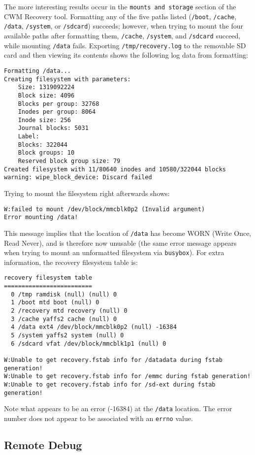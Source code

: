 \documentclass{article}
\begin{document}
The more interesting results occur in the \texttt{mounts and storage} section of the CWM Recovery tool. Formatting any of the five paths listed (\texttt{/boot}, \texttt{/cache}, \texttt{/data}, \texttt{/system}, or \texttt{/sdcard}) succeeds; however, when trying to mount the four available paths after formatting them, \texttt{/cache}, \texttt{/system}, and \texttt{/sdcard} succeed, while mounting \texttt{/data} fails. Exporting \texttt{/tmp/recovery.log} to the removable SD card and then viewing its contents shows the following log data from formatting:
\begin{lstlisting}
Formatting /data...
Creating filesystem with parameters:
    Size: 1319092224
    Block size: 4096
    Blocks per group: 32768
    Inodes per group: 8064
    Inode size: 256
    Journal blocks: 5031
    Label: 
    Blocks: 322044
    Block groups: 10
    Reserved block group size: 79
Created filesystem with 11/80640 inodes and 10580/322044 blocks
warning: wipe_block_device: Discard failed
\end{lstlisting}
Trying to mount the filesystem right afterwards shows:
\begin{lstlisting}
W:failed to mount /dev/block/mmcblk0p2 (Invalid argument)
Error mounting /data!
\end{lstlisting}
This message implies that the location of \texttt{/data} has become WORN (Write Once, Read Never), and is therefore now unusable (the same error message appears when trying to mount an unformatted filesystem via \texttt{busybox}). For extra information, the recovery filesystem table is:
\begin{lstlisting}
recovery filesystem table
=========================
  0 /tmp ramdisk (null) (null) 0
  1 /boot mtd boot (null) 0
  2 /recovery mtd recovery (null) 0
  3 /cache yaffs2 cache (null) 0
  4 /data ext4 /dev/block/mmcblk0p2 (null) -16384
  5 /system yaffs2 system (null) 0
  6 /sdcard vfat /dev/block/mmcblk1p1 (null) 0

W:Unable to get recovery.fstab info for /datadata during fstab generation!
W:Unable to get recovery.fstab info for /emmc during fstab generation!
W:Unable to get recovery.fstab info for /sd-ext during fstab generation!
\end{lstlisting}
Note what appears to be an error (-16384) at the \texttt{/data} location. The error number does not appear to be associated with an \texttt{errno} value.

\subsection{Remote Debug}
\end{document}
